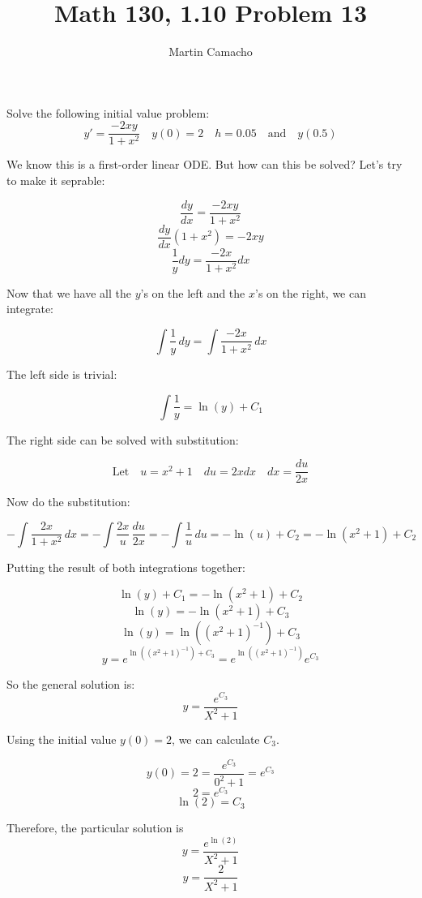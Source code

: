 \documentclass{article}
\begin{document}
\title{Math 130, 1.10 Problem 13}

\author{Martin Camacho}
\maketitle

Solve the following initial value problem:
\[ 
  y' = \frac{-2xy}{1 + x^2} \quad
  y(0) = 2  \quad h = 0.05 \quad \textrm{and} \quad y(0.5)
\]

We know this is a first-order linear ODE. But how can this be solved? 
Let's try to make it seprable:

\[ \frac{dy}{dx} = \frac{-2xy}{1 + x^2} \]
\[ \frac{dy}{dx}(1 + x^2) = -2xy \]
\[ \frac{1}{y}dy = \frac{-2x}{1 + x^2}dx \]

Now that we have all the \(y\)'s on the left and the \(x\)'s on the right, we can integrate:

\[ \int \frac{1}{y} \,dy = \int \frac{-2x}{1 + x^2} \,dx \]

The left side is trivial:

\[ \int \frac{1}{y} = \ln(y) + C_1\]

The right side can be solved with substitution:

\[\textrm{Let} \quad u = x^2 + 1 \quad du = 2xdx \quad dx = \frac{du}{2x}\]

Now do the substitution:

\[-\int \frac{2x}{1 + x^2} \,dx = -\int \frac{2x}{u} \,\frac{du}{2x} = -\int \frac{1}{u} \,du = -\ln(u) + C_2 = -\ln(x^2 + 1) + C_2\]

Putting the result of both integrations together:

\[ \ln(y) + C_1 = -\ln(x^2 + 1) + C_2\]
\[ \ln(y) = -\ln(x^2 + 1) + C_3\]
\[ \ln(y) = \ln((x^2 + 1)^{-1}) + C_3\]
\[ y = e^{\ln((x^2 + 1)^{-1}) + C_3} = e^{\ln((x^2 + 1)^{-1})}e^{C_3}\]

So the general solution is:
\[ y = \frac{e^{C_3}}{X^2 + 1}\]

Using the initial value  \(y(0) = 2\), we can calculate  \(C_3\).

\[ y(0) = 2 = \frac{e^{C_3}}{0^2 + 1} = e^{C_3}\]
\[ 2 = e^{C_3}\]
\[ \ln(2) = C_3\]

Therefore, the particular solution is
\[ y = \frac{e^{\ln(2)}}{X^2 + 1}\]
\[ y = \frac{2}{X^2 + 1}\]
\end{document}
